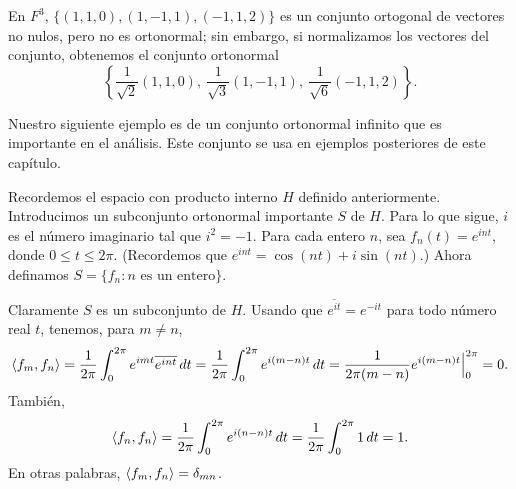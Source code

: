 \documentclass[12pt,a4paper]{book}
\begin{document}
    \begin{ejemplo}
        En $F^3$, $\{(1,1,0),(1,-1,1),(-1,1,2)\}$ es un conjunto ortogonal de vectores no nulos, pero no es ortonormal; sin embargo, si normalizamos los vectores del conjunto, obtenemos el conjunto ortonormal
        \begin{equation*}
            \left\{\frac{1}{\sqrt2}(1,1,0),\ \frac{1}{\sqrt3}(1,-1,1),\ \frac{1}{\sqrt6}(-1,1,2)\right\}.
        \end{equation*}
    \end{ejemplo}

    Nuestro siguiente ejemplo es de un conjunto ortonormal infinito que es importante en el análisis. Este conjunto se usa en ejemplos posteriores de este capítulo.

    \begin{ejemplo}
        Recordemos el espacio con producto interno $H$ definido anteriormente. Introducimos un subconjunto ortonormal importante $S$ de $H$. Para lo que sigue, $i$ es el número imaginario tal que $i^2=-1$. Para cada entero $n$, sea $f_n(t)=e^{int}$, donde $0\leq t\leq 2\pi$. (Recordemos que $e^{int}=\cos(nt)+i\sin(nt)$.) Ahora definamos $S=\{f_n: n\text{ es un entero}\}$.

        Claramente $S$ es un subconjunto de $H$. Usando que $\overline{e^{it}}=e^{-it}$ para todo número real $t$, tenemos, para $m\neq n$,
        \begin{align*}
            \left\langle f_m, f_n \right\rangle=\frac{1}{2\pi}\int_0^{2\pi}e^{imt}\overline{e^{int}}\,dt=\frac{1}{2\pi}\int_0^{2\pi}e^{i(m-n)t}\,dt=\frac{1}{2\pi(m-n)}e^{i(m-n)t}\Big|_0^{2\pi}=0.
        \end{align*}
        También,
        \begin{equation*}
            \left\langle f_n, f_n \right\rangle=\frac{1}{2\pi}\int_0^{2\pi}e^{i(n-n)t}\,dt=\frac{1}{2\pi}\int_0^{2\pi}1\,dt=1.
        \end{equation*}
        En otras palabras, $\left\langle f_m, f_n \right\rangle=\delta_{mn}$.
    \end{ejemplo}
\end{document}
